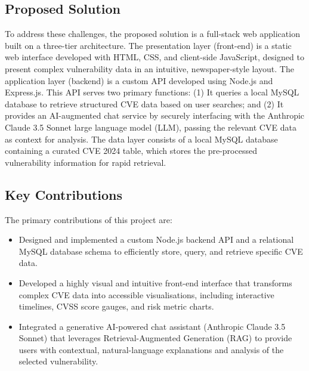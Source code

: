 \documentclass[12pt,a4paper]{article}
\begin{document}
    \subsection{Proposed Solution}
    To address these challenges, the proposed solution is a full-stack web application built on a three-tier architecture.
    The presentation layer (front-end) is a static web interface developed with HTML, CSS, and client-side JavaScript\cite{Nodejs}, designed to present complex vulnerability data in an intuitive, newspaper-style layout.
    The application layer (backend) is a custom API developed using Node.js\cite{Nodejs} and Express.js\cite{Express_5.1.0}.
    This API serves two primary functions: (1) It queries a local MySQL\cite{Mysql} database to retrieve structured CVE data based on user searches; and (2) It provides an AI-augmented chat service by securely interfacing with the Anthropic Claude 3.5 Sonnet large language model (LLM)\cite{Claude_Sonnet}, passing the relevant CVE data as context for analysis.
    The data layer consists of a local MySQL database\cite{Mysql} containing a curated CVE 2024 table, which stores the pre-processed vulnerability information for rapid retrieval.
    \clearpage
    \subsection{Key Contributions}
    The primary contributions of this project are:
    \begin{itemize}[label=$\bullet$, leftmargin=*]
        \item Designed and implemented a custom Node.js\cite{Nodejs} backend API and a relational MySQL\cite{Mysql} database schema to efficiently store, query, and retrieve specific CVE data\cite{CVSS_v3_Scoring_Systems_Documentation}.
        \item Developed a highly visual and intuitive front-end interface that transforms complex CVE data\cite{National_Vulnerability_Database} into accessible visualisations, including interactive timelines, CVSS score gauges, and risk metric charts\cite{What_is_a_CVSS_score_and_how_to_prioritise_WordPress_vulnerabilities}\cite{What_is_a_CVSS_score_and_how_to_prioritise_WordPress_vulnerabilities}\cite{National_Vulnerability_Database}.
        \item Integrated a generative AI-powered chat assistant (Anthropic Claude 3.5 Sonnet)\cite{anthropic_Building_AI_for_cyber_defenders} that leverages Retrieval-Augmented Generation (RAG)\cite{bhartiya2025} to provide users with contextual, natural-language explanations and analysis of the selected vulnerability.
    \end{itemize}
\end{document}
